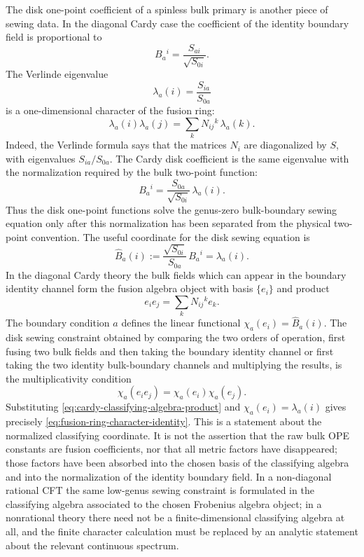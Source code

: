 The disk one-point coefficient of a spinless bulk primary is another piece
of sewing data.  In the diagonal Cardy case the coefficient of the identity
boundary field is proportional to
\[
  B_a{}^i=\frac{S_{ai}}{\sqrt{S_{0i}}}.
\]
The Verlinde eigenvalue
\begin{equation}
  \lambda_a(i)=\frac{S_{ia}}{S_{0a}}
  \label{eq:cardy-fusion-ring-character}
\end{equation}
is a one-dimensional character of the fusion ring:
\begin{equation}
  \lambda_a(i)\lambda_a(j)
  =
  \sum_k N_{ij}{}^k\,\lambda_a(k).
  \label{eq:fusion-ring-character-identity}
\end{equation}
Indeed, the Verlinde formula says that the matrices \(N_i\) are diagonalized
by \(S\), with eigenvalues \(S_{ia}/S_{0a}\).  The Cardy disk coefficient is
the same eigenvalue with the normalization required by the bulk two-point
function:
\[
  B_a{}^i
  =
  \frac{S_{0a}}{\sqrt{S_{0i}}}\,\lambda_a(i).
\]
Thus the disk one-point functions solve the genus-zero bulk-boundary sewing
equation only after this normalization has been separated from the physical
two-point convention.  The useful coordinate for the disk sewing equation is
\begin{equation}
  \widehat B_a(i)
  :=
  \frac{\sqrt{S_{0i}}}{S_{0a}}\,B_a{}^i
  =
  \lambda_a(i).
  \label{eq:cardy-normalized-classifying-coordinate}
\end{equation}
In the diagonal Cardy theory the bulk fields which can appear in the boundary
identity channel form the fusion algebra object with basis \(\{e_i\}\) and
product
\begin{equation}
  e_i e_j=\sum_k N_{ij}{}^k e_k .
  \label{eq:cardy-classifying-algebra-product}
\end{equation}
The boundary condition \(a\) defines the linear functional
\(\chi_a(e_i)=\widehat B_a(i)\).  The disk sewing constraint obtained by
comparing the two orders of operation, first fusing two bulk fields and then
taking the boundary identity channel or first taking the two identity
bulk-boundary channels and multiplying the results, is the multiplicativity
condition
\begin{equation}
  \chi_a(e_i e_j)
  =
  \chi_a(e_i)\chi_a(e_j).
  \label{eq:cardy-disk-two-bulk-classifying-sewing}
\end{equation}
Substituting \eqref{eq:cardy-classifying-algebra-product} and
\(\chi_a(e_i)=\lambda_a(i)\) gives precisely
\eqref{eq:fusion-ring-character-identity}.  This is a statement about the
normalized classifying coordinate.  It is not the assertion that the raw
bulk OPE constants are fusion coefficients, nor that all metric factors have
disappeared; those factors have been absorbed into the chosen basis of the
classifying algebra and into the normalization of the identity boundary
field.  In a non-diagonal rational CFT the same low-genus sewing constraint
is formulated in the classifying algebra associated to the chosen Frobenius
algebra object; in a nonrational theory there need not be a
finite-dimensional classifying algebra at all, and the finite character
calculation must be replaced by an analytic statement about the relevant
continuous spectrum.

